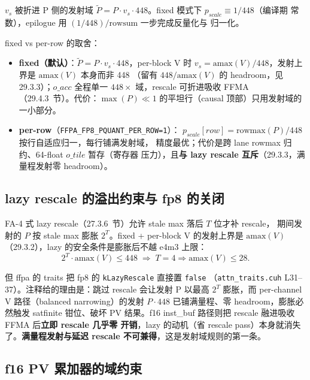 $v_s$ 被折进 P 侧的发射域
$\tilde P = P\cdot v_s\cdot448$。fixed 模式下 $p_{scale}\equiv1/448$（编译期
常数），epilogue 用 $(1/448)/\mathrm{rowsum}$ 一步完成反量化与
归一化。

fixed vs per-row 的取舍：
\begin{itemize}[itemsep=1pt,topsep=2pt]
  \item \textbf{fixed（默认）}：$\tilde P = P\cdot v_s\cdot448$，per-block V 时
        $v_s=\mathrm{amax}(V)/448$，发射上界是 $\mathrm{amax}(V)$ 本身而非 448
        （留有 $448/\mathrm{amax}(V)$ 的 headroom，见 29.3.3）；$o\_acc$ 全程单一
        $448\times$ 域，rescale 可折进吸收 FFMA
        （29.4.3~节）。代价：$\max(P)\ll1$ 的平坦行（causal 顶部）只用发射域的
        一小部分。
  \item \textbf{per-row}（\texttt{FFPA\_FP8\_PQUANT\_PER\_ROW=1}）：
        $p_{scale}[row]=\mathrm{rowmax}(P)/448$ 按行自适应归一，每行铺满发射域，
        精度最优；代价是跨 lane rowmax 归约、64-float $o\_tile$ 暂存（寄存器
        压力），且\textbf{与 lazy rescale 互斥}（29.3.3，满量程发射零 headroom）。
\end{itemize}

\subsection{lazy rescale 的溢出约束与 fp8 的关闭}\label{sec:29-lazy}

FA-4 式 lazy rescale（27.3.6~节）允许 stale max 落后 $T$ 位才补 rescale，
期间发射的 $P$ 按 stale max 膨胀 $2^T$。fixed + per-block V 的发射上界是
$\mathrm{amax}(V)$（29.3.2），lazy 的安全条件是膨胀后不越 e4m3 上限：
\begin{equation}
  2^T\cdot\mathrm{amax}(V)\le448
  \;\Longrightarrow\;
  T=4\Rightarrow \mathrm{amax}(V)\le28 .
\end{equation}

但 ffpa 的 traits 把 fp8 的 \texttt{kLazyRescale} 直接置 \texttt{false}
（\texttt{attn\_traits.cuh} L31--37）。注释给的理由是：跳过 rescale 会让发射 P
以最高 $2^T$ 膨胀，而 per-channel V 路径（balanced narrowing）的发射
$P\cdot448$ 已铺满量程、零 headroom，膨胀必然触发 satfinite 钳位、破坏 PV
结果。f16 inst\_buf 路径则把 rescale 融进吸收 FFMA 后\textbf{立即 rescale 几乎零
开销}，lazy 的动机（省 rescale pass）本身就消失了。\textbf{满量程发射与延迟 rescale
不可兼得}，这是发射域规则的第一条。

\subsection{f16 PV 累加器的域约束}\label{sec:29-f16acc}

